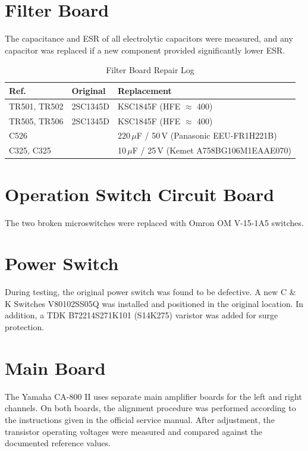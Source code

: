 \documentclass[]{article}
\begin{document}
\section{Filter Board}

The capacitance and ESR of all electrolytic capacitors were measured, and any capacitor was replaced if a new component provided significantly lower ESR.

\begin{table}[H]
	\centering
	\caption{Filter Board Repair Log}
	\label{tab:repair_log_filter_board}
	\begin{tabular}{|l|l|l|}
		\hline
		\textbf{Ref.} & \textbf{Original} & \textbf{Replacement} \\
		\hline
		TR501, TR502 & 2SC1345D & KSC1845F (HFE $\approx$ 400) \\
		TR505, TR506 & 2SC1345D & KSC1845F (HFE $\approx$ 400) \\
		\hline
		C526 &  &   220\,$\mu$F / 50\,V (Panasonic EEU-FR1H221B) \\
		C325, C325& & 10\,$\mu$F / 25\,V (Kemet A758BG106M1EAAE070) \\
		\hline
	\end{tabular}
\end{table}

\section{Operation Switch Circuit Board}

The two broken microswitches were replaced with Omron OM V-15-1A5 switches.

\section{Power Switch}

During testing, the original power switch was found to be defective. A new C \& K Switches V80102SS05Q was installed and positioned in the original location. In addition, a TDK B72214S271K101 (S14K275) varistor was added for surge protection.

\section{Main Board}

The Yamaha CA-800 II uses separate main amplifier boards for the left and right channels. On both boards, the alignment procedure was performed according to the instructions given in the official service manual. After adjustment, the transistor operating voltages were measured and compared against the documented reference values.
\end{document}
